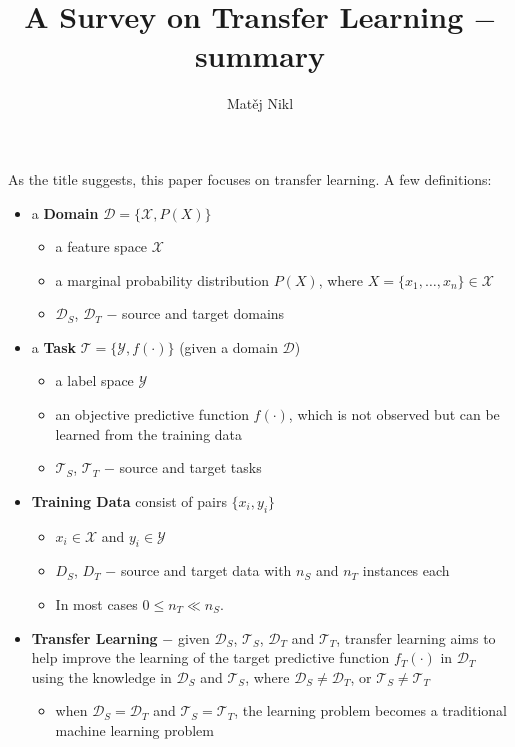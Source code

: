 \documentclass[a4paper,twocolumn]{article}
\title{A Survey on Transfer Learning $-$ summary}
\author{Matěj Nikl}
\newcommand{\D}{\mathcal{D}}
\newcommand{\T}{\mathcal{T}}
\newcommand{\X}{\mathcal{X}}
\newcommand{\Y}{\mathcal{Y}}
\begin{document}
\maketitle
As the title suggests, this paper focuses on transfer learning.
A few definitions:

\begin{itemize}
    \item a \textbf{Domain} $\D = \{\X, P(X)\}$
        \begin{itemize}
            \item a feature space $\X$
            \item a marginal probability distribution $P(X)$, where $X = \{x_1, \ldots, x_n\} \in \X$
            \item $\D_S$, $\D_T$ $-$ source and target domains
        \end{itemize}
    \item a \textbf{Task} $\T = \{\Y, f(\cdot)\}$ (given a domain $\D$)
        \begin{itemize}
            \item a label space $\Y$
            \item an objective predictive function $f(\cdot)$, which is not observed but can be learned from the training data
            \item $\T_S$, $\T_T$ $-$ source and target tasks
        \end{itemize}
    \item \textbf{Training Data} consist of pairs $\{x_i, y_i\}$
        \begin{itemize}
            \item $x_i \in \X$ and $y_i \in \Y$
            \item $D_S$, $D_T$ $-$ source and target data with $n_S$ and $n_T$ instances each
            \item In most cases $0 \le n_T \ll n_S$.
        \end{itemize}
    \item \textbf{Transfer Learning} $-$ given $\D_S$, $\T_S$, $\D_T$ and $\T_T$, transfer learning aims to help improve the learning of the target predictive function $f_T(\cdot)$ in $\D_T$ using the knowledge in $\D_S$ and $\T_S$, where $\D_S \ne \D_T$, or $\T_S \ne \T_T$
        \begin{itemize}
            \item when $\D_S = \D_T$ and $\T_S = \T_T$, the learning problem becomes a traditional machine learning problem
        \end{itemize}
\end{itemize}
\end{document}
